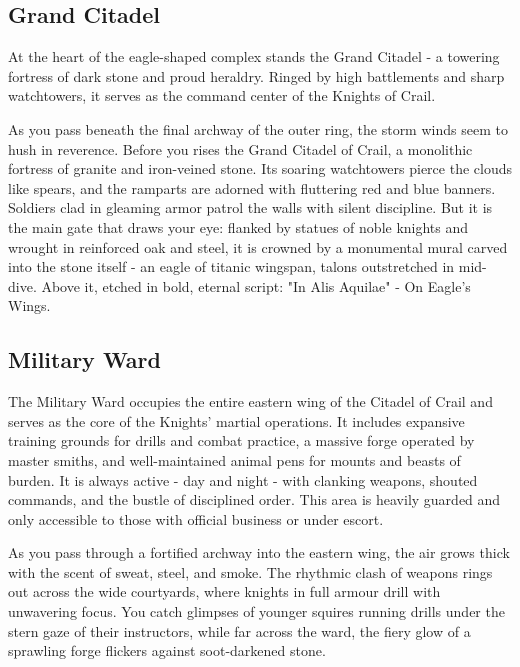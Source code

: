 \subsection*{ Grand Citadel}
{\entryfont At the heart of the eagle-shaped complex stands the Grand Citadel - a towering fortress of dark stone and proud heraldry. Ringed by high battlements and sharp watchtowers, it serves as the command center of the Knights of Crail.}
\vfill\eject
\begin{DndReadAloud}
	As you pass beneath the final archway of the outer ring, the storm winds seem to hush in reverence. Before you rises the Grand Citadel of Crail, a monolithic fortress of granite and iron-veined stone. Its soaring watchtowers pierce the clouds like spears, and the ramparts are adorned with fluttering red and blue banners. Soldiers clad in gleaming armor patrol the walls with silent discipline. But it is the main gate that draws your eye: flanked by statues of noble knights and wrought in reinforced oak and steel, it is crowned by a monumental mural carved into the stone itself - an eagle of titanic wingspan, talons outstretched in mid-dive. Above it, etched in bold, eternal script: "In Alis Aquilae" - On Eagle's Wings.
\end{DndReadAloud}
\subsection*{ Military Ward}
{\entryfont The Military Ward occupies the entire eastern wing of the Citadel of Crail and serves as the core of the Knights' martial operations. It includes expansive training grounds for drills and combat practice, a massive forge operated by master smiths, and well-maintained animal pens for mounts and beasts of burden. It is always active - day and night - with clanking weapons, shouted commands, and the bustle of disciplined order. This area is heavily guarded and only accessible to those with official business or under escort.}
\begin{DndReadAloud}
	As you pass through a fortified archway into the eastern wing, the air grows thick with the scent of sweat, steel, and smoke. The rhythmic clash of weapons rings out across the wide courtyards, where knights in full armour drill with unwavering focus. You catch glimpses of younger squires running drills under the stern gaze of their instructors, while far across the ward, the fiery glow of a sprawling forge flickers against soot-darkened stone.
\end{DndReadAloud}
